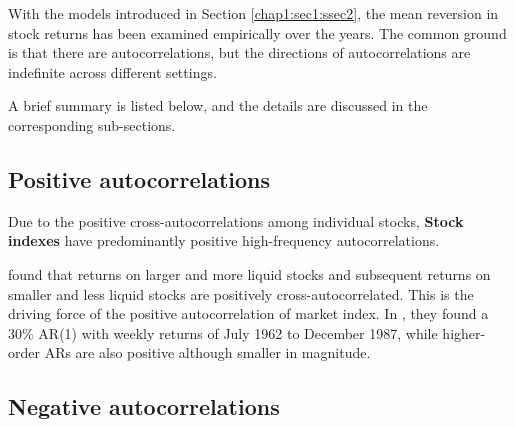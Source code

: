 With the models introduced in Section \ref{chap1:sec1:ssec2}, the mean reversion in stock returns
has been examined empirically over the years. The common ground is that there are autocorrelations,
but the directions of autocorrelations are indefinite across different settings.

A brief summary is listed below, and the details are discussed in the corresponding sub-sections.

\subsection{Positive autocorrelations}
Due to the positive cross-autocorrelations among individual stocks, \textbf{Stock indexes} have predominantly
positive high-frequency autocorrelations.

\citet{lo1988stock,lo1990contrarian} found that returns on larger and more liquid stocks and subsequent
returns on smaller and less liquid stocks are positively cross-autocorrelated. This is the driving force of 
the positive autocorrelation of market index. In \citeyear{lo1988stock}, they found a 30\% AR(1) with weekly returns
of July 1962 to December 1987, while higher-order ARs
are also positive although smaller in magnitude.


\subsection{Negative autocorrelations}


